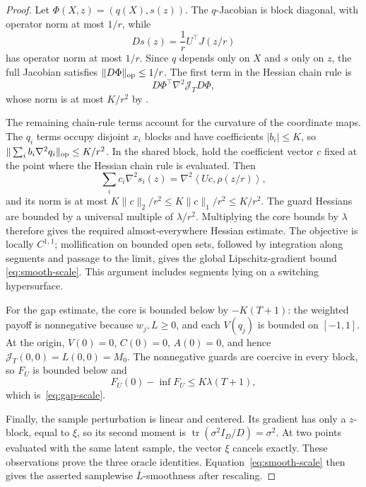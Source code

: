 \documentclass[11pt]{article}
\newcommand{\ip}[2]{\left\langle #1,#2\right\rangle}
\newcommand{\Lb}{\bar L}
\theoremstyle{definition}
\theoremstyle{remark}
\begin{document}
\begin{proof}
Let $\Phi(X,z)=(q(X),s(z))$. The $q$-Jacobian is block diagonal, with
operator norm at most $1/r$, while
\[
 Ds(z)=\frac1rU^\top J(z/r)
\]
has operator norm at most $1/r$. Since $q$ depends only on $X$ and $s$
only on $z$, the full Jacobian satisfies $\|D\Phi\|_{\rm op}\le1/r$.
The first term in the Hessian chain rule is
\[
 D\Phi^\top\nabla^2\mathcal J_TD\Phi,
\]
whose norm is at most $K/r^2$ by
.

The remaining chain-rule terms account for the curvature of the coordinate
maps. The $q_i$ terms occupy disjoint $x_i$ blocks and have coefficients
$|b_i|\le K$, so
$\|\sum_i b_i\nabla^2q_i\|_{\rm op}\le K/r^2$.  In the shared block, hold the coefficient vector $c$ fixed at the point where the Hessian chain rule is evaluated. Then
\[
 \sum_i c_i\nabla^2s_i(z)
 =\nabla^2\ip{Uc}{\rho(z/r)},
\]
and its norm is at most
$K\|c\|_2/r^2\le K\|c\|_1/r^2\le K/r^2$.
The guard Hessians are bounded by a universal multiple of $\lambda/r^2$.
Multiplying the core bounds by $\lambda$ therefore gives the required
almost-everywhere Hessian estimate. The objective is locally $C^{1,1}$;
mollification on bounded open sets, followed by integration along segments
and passage to the limit, gives the global Lipschitz-gradient bound
\eqref{eq:smooth-scale}. This argument includes segments lying on a
switching hypersurface.

For the gap estimate, the core is bounded below by $-K(T+1)$: the weighted
payoff is nonnegative because
$w_j,L\ge0$, and each $V(q_j)$ is bounded on $[-1,1]$.  At the origin,
$V(0)=0$, $C(0)=0$, $A(0)=0$, and hence
$\mathcal J_T(0,0)=L(0,0)=M_0$.  The nonnegative guards are coercive in every
block, so $F_U$ is bounded below and
\[
 F_U(0)-\inf F_U\le K\lambda(T+1),
\]
which is~\eqref{eq:gap-scale}.

Finally, the sample perturbation is linear and centered.  Its gradient has
only a $z$-block, equal to $\xi$, so its second moment is
$\operatorname{tr}(\sigma^2I_D/D)=\sigma^2$. At two points evaluated with
the same latent sample, the vector $\xi$ cancels exactly. These observations
prove the three oracle identities. Equation~\eqref{eq:smooth-scale} then
gives the asserted samplewise $\Lb$-smoothness after rescaling.
\end{proof}
\end{document}
